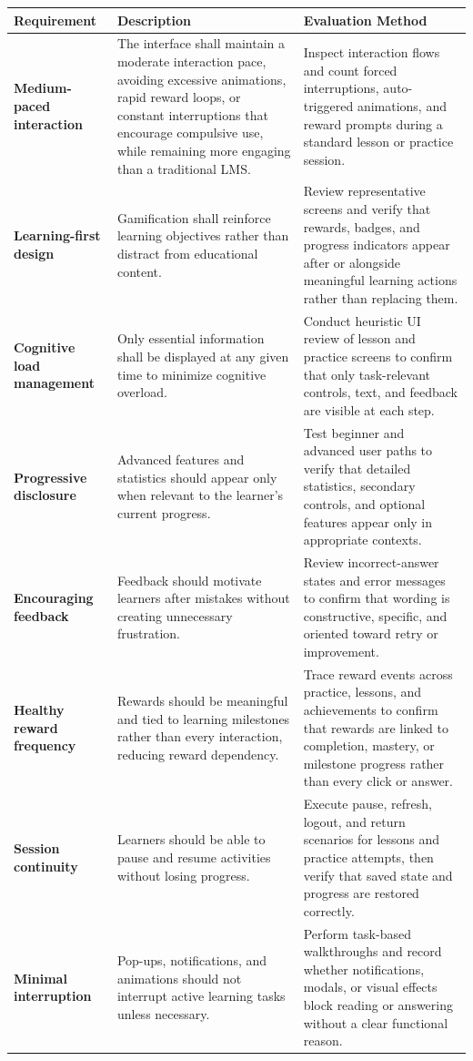 \begin{longtable}{|L{0.22\textwidth}|L{0.46\textwidth}|L{0.22\textwidth}|}
\hline
\textbf{Requirement} & \textbf{Description} & \textbf{Evaluation Method} \\ \hline
\textbf{Medium-paced interaction} & The interface shall maintain a moderate interaction pace, avoiding excessive animations, rapid reward loops, or constant interruptions that encourage compulsive use, while remaining more engaging than a traditional LMS. & Inspect interaction flows and count forced interruptions, auto-triggered animations, and reward prompts during a standard lesson or practice session. \\ \hline
\textbf{Learning-first design} & Gamification shall reinforce learning objectives rather than distract from educational content. & Review representative screens and verify that rewards, badges, and progress indicators appear after or alongside meaningful learning actions rather than replacing them. \\ \hline
\textbf{Cognitive load management} & Only essential information shall be displayed at any given time to minimize cognitive overload. & Conduct heuristic UI review of lesson and practice screens to confirm that only task-relevant controls, text, and feedback are visible at each step. \\ \hline
\textbf{Progressive disclosure} & Advanced features and statistics should appear only when relevant to the learner's current progress. & Test beginner and advanced user paths to verify that detailed statistics, secondary controls, and optional features appear only in appropriate contexts. \\ \hline
\textbf{Encouraging feedback} & Feedback should motivate learners after mistakes without creating unnecessary frustration. & Review incorrect-answer states and error messages to confirm that wording is constructive, specific, and oriented toward retry or improvement. \\ \hline
\textbf{Healthy reward frequency} & Rewards should be meaningful and tied to learning milestones rather than every interaction, reducing reward dependency. & Trace reward events across practice, lessons, and achievements to confirm that rewards are linked to completion, mastery, or milestone progress rather than every click or answer. \\ \hline
\textbf{Session continuity} & Learners should be able to pause and resume activities without losing progress. & Execute pause, refresh, logout, and return scenarios for lessons and practice attempts, then verify that saved state and progress are restored correctly. \\ \hline
\textbf{Minimal interruption} & Pop-ups, notifications, and animations should not interrupt active learning tasks unless necessary. & Perform task-based walkthroughs and record whether notifications, modals, or visual effects block reading or answering without a clear functional reason. \\ \hline
\end{longtable}

